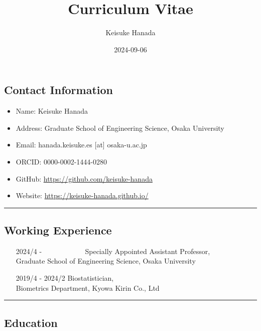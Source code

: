 \documentclass[
  12pt,
]{article}
\title{Curriculum Vitae}
\author{Keisuke Hanada}
\date{2024-09-06}
\providecommand{\tightlist}{%
  \setlength{\itemsep}{0pt}\setlength{\parskip}{0pt}}
\begin{document}
\maketitle

\hypertarget{contact-information}{%
\subsection{\texorpdfstring{\textbf{Contact
Information}}{Contact Information}}\label{contact-information}}

\begin{itemize}
\tightlist
\item
  Name: Keisuke Hanada
\item
  Address: Graduate School of Engineering Science, Osaka University
\item
  Email: hanada.keisuke.es {[}at{]} osaka-u.ac.jp
\item
  ORCID: 0000-0002-1444-0280
\item
  GitHub: \url{https://github.com/keisuke-hanada}
\item
  Website: \url{https://keisuke-hanada.github.io/}
\end{itemize}

\begin{center}\rule{0.5\linewidth}{0.5pt}\end{center}

\hypertarget{working-experience}{%
\subsection{Working Experience}\label{working-experience}}

\begin{itemize}[left=80pt, labelsep=1em, itemindent=0pt, label={}]
  \item[2024/4 - ~~~~~~~~~~~] Specially Appointed Assistant Professor,  \\
  Graduate School of Engineering Science, Osaka University
  \item[2019/4 - 2024/2] Biostatistician, \\
  Biometrics Department, Kyowa Kirin Co., Ltd
\end{itemize}

\begin{center}\rule{0.5\linewidth}{0.5pt}\end{center}

\hypertarget{education}{%
\subsection{Education}\label{education}}
\end{document}
